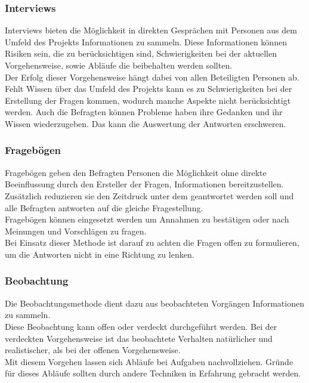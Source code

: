 \documentclass[12pt,a4paper]{article}
\begin{document}
\subsubsection{Interviews}
\label{interview}
Interviews bieten die Möglichkeit in direkten Gesprächen mit Personen aus dem Umfeld des Projekts Informationen zu sammeln. Diese Informationen können Risiken sein, die zu berücksichtigen sind, Schwierigkeiten bei der aktuellen Vorgehensweise, sowie Abläufe die beibehalten werden sollten. \\
Der Erfolg dieser Vorgehensweise hängt dabei von allen Beteiligten Personen ab. Fehlt Wissen über das Umfeld des Projekts kann es zu Schwierigkeiten bei der Erstellung der Fragen kommen, wodurch manche Aspekte nicht berücksichtigt werden. Auch die Befragten können Probleme haben ihre Gedanken und ihr Wissen wiederzugeben\cite{tiwari2012selecting}. Das kann die Auswertung der Antworten erschweren.
\subsubsection{Fragebögen}
\label{Fragebögen}
Fragebögen geben den Befragten Personen die Möglichkeit ohne direkte Beeinflussung durch den Ersteller der Fragen, Informationen bereitzustellen. Zusätzlich reduzieren sie den Zeitdruck unter dem geantwortet werden soll und alle Befragten antworten auf die gleiche Fragestellung.\\
Fragebögen können eingesetzt werden um Annahmen zu bestätigen oder nach Meinungen und Vorschlägen zu fragen\cite{tiwari2012selecting}. \\
Bei Einsatz dieser Methode ist darauf zu achten die Fragen offen zu formulieren, um die Antworten nicht in eine Richtung zu lenken. 
\subsubsection{Beobachtung}
\label{Beobachtung}
Die Beobachtungsmethode dient dazu aus beobachteten Vorgängen Informationen zu sammeln. \\
Diese Beobachtung kann offen oder verdeckt durchgeführt werden. Bei der verdeckten Vorgehensweise ist das beobachtete Verhalten natürlicher und realistischer, als bei der offenen Vorgehensweise\cite{silhavy2011requirements}. \\
Mit diesem Vorgehen lassen sich Abläufe bei Aufgaben nachvollziehen. Gründe für dieses Abläufe sollten durch andere Techniken in Erfahrung gebracht werden.\\
\end{document}
